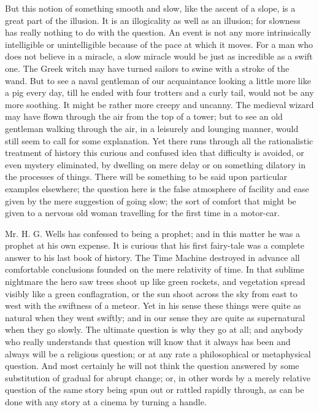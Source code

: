 But this notion of something smooth and slow, like the ascent of a slope, is a great part of the illusion. It is an illogicality as well as an illusion; for slowness has really nothing to do with the question. An event is not any more intrinsically intelligible or unintelligible because of the pace at which it moves. For a man who does not believe in a miracle, a slow miracle would be just as incredible as a swift one. The Greek witch may have turned sailors to swine with a stroke of the wand. But to see a naval gentleman of our acquaintance looking a little more like a pig every day, till he ended with four trotters and a curly tail, would not be any more soothing. It might be rather more creepy and uncanny. The medieval wizard may have flown through the air from the top of a tower; but to see an old gentleman walking through the air, in a leisurely and lounging manner, would still seem to call for some explanation. Yet there runs through all the rationalistic treatment of history this curious and confused idea that difficulty is avoided, or even mystery eliminated, by dwelling on mere delay or on something dilatory in the processes of things. There will be something to be said upon particular examples elsewhere; the question here is the false atmosphere of facility and ease given by the mere suggestion of going slow; the sort of comfort that might be given to a nervous old woman travelling for the first time in a motor-car.

Mr. H. G. Wells has confessed to being a prophet; and in this matter he was a prophet at his own expense. It is curious that his first fairy-tale was a complete answer to his last book of history. The Time Machine destroyed in advance all comfortable conclusions founded on the mere relativity of time. In that sublime nightmare the hero saw trees shoot up like green rockets, and vegetation spread visibly like a green conflagration, or the sun shoot across the sky from east to west with the swiftness of a meteor. Yet in his sense these things were quite as natural when they went swiftly; and in our sense they are quite as supernatural when they go slowly. The ultimate question is why they go at all; and anybody who really understands that question will know that it always has been and always will be a religious question; or at any rate a philosophical or metaphysical question. And most certainly he will not think the question answered by some substitution of gradual for abrupt change; or, in other words by a merely relative question of the same story being spun out or rattled rapidly through, as can be done with any story at a cinema by turning a handle.

